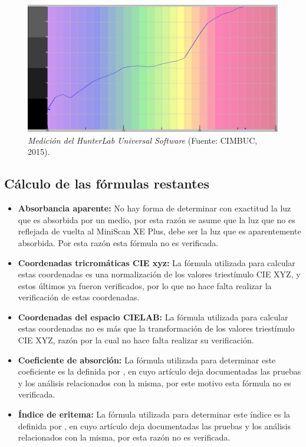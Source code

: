  	\begin{figure}[H]
		\centering
		\includegraphics[scale=0.45]{img/medicion-hunterlab.jpg}
			\caption[Medici\'{o}n del HunterLab Universal Software]{\textit{Medici\'{o}n del HunterLab Universal Software} (Fuente: CIMBUC, 2015).}
	\end{figure}
	
\subsection{C\'{a}lculo de las f\'{o}rmulas restantes}

	\begin{itemize}
		
		\item \textbf{Absorbancia aparente:} No hay forma de determinar con exactitud la luz que es absorbida por un medio, por esta raz\'{o}n se asume que la luz que no es reflejada de vuelta al MiniScan XE Plus, debe ser la luz que es aparentemente absorbida. Por esta raz\'{o}n esta f\'{o}rmula no es verificada.
	
		\item \textbf{Coordenadas tricrom\'{a}ticas CIE xyz:} La f\'{o}rmula utilizada para calcular estas coordenadas es una normalizaci\'{o}n de los valores triest\'{i}mulo CIE XYZ, y estos \'{u}ltimos ya fueron verificados, por lo que no hace falta realizar la verificaci\'{o}n de estas coordenadas.
		
		\item \textbf{Coordenadas del espacio CIELAB:} La f\'{o}rmula utilizada para calcular estas coordenadas no es m\'{a}s que la transformaci\'{o}n de los valores triest\'{i}mulo CIE XYZ, raz\'{o}n por la cual no hace falta realizar su verificaci\'{o}n.
		
		\item \textbf{Coeficiente de absorci\'{o}n:} La f\'{o}rmula utilizada para determinar este coeficiente es la definida por , en cuyo art\'{i}culo deja documentadas las pruebas y los an\'{a}lisis relacionados con la misma, por este motivo esta f\'{o}rmula no es verificada.
		
		\item \textbf{\'{I}ndice de eritema:} La f\'{o}rmula utilizada para determinar este \'{i}ndice es la definida por , en cuyo art\'{i}culo deja documentadas las pruebas y los an\'{a}lisis relacionados con la misma, por esta raz\'{o}n no es verificada.
	\end{itemize}
	
